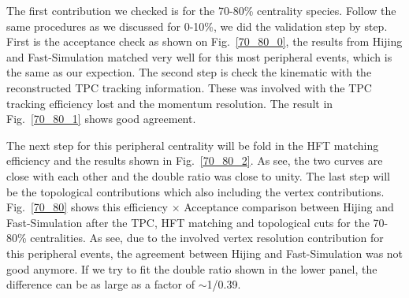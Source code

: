 The first contribution we checked is for the 70-80\% centrality species. Follow the same procedures as we discussed for 0-10\%, we did the validation step by step. First is the acceptance check as shown on Fig.~\ref{70_80_0}, the results from Hijing and Fast-Simulation matched very well for this most peripheral events, which is the same as our expection. The second step is check the kinematic with the reconstructed TPC tracking information. These was involved with the TPC tracking efficiency lost and the momentum resolution. The result in Fig.~\ref{70_80_1} shows good agreement.

The next step for this peripheral centrality will be fold in the HFT matching efficiency and the results shown in Fig.~\ref{70_80_2}. As see, the two curves are close with each other and the double ratio was close to unity. The last step will be the topological contributions which also including the vertex contributions. Fig.~\ref{70_80} shows this efficiency $\times$ Acceptance comparison between Hijing and Fast-Simulation after the TPC, HFT matching and topological cuts for the 70-80\% centralities. As see, due to the involved vertex resolution contribution for this peripheral events, the agreement between Hijing and Fast-Simulation was not good anymore. If we try to fit the double ratio shown in the lower panel, the difference can be as large as a factor of $\sim$1/0.39.


